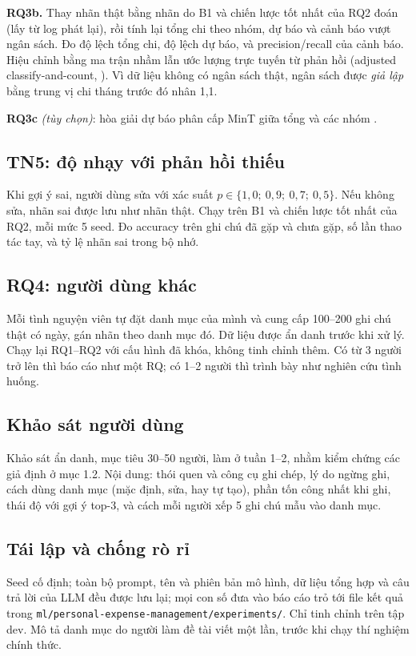 \documentclass[12pt,a4paper]{article}
\begin{document}
\textbf{RQ3b.} Thay nhãn thật bằng nhãn do B1 và chiến lược tốt nhất của RQ2 đoán (lấy từ log phát lại), rồi tính lại tổng chi theo nhóm, dự báo và cảnh báo vượt ngân sách. Đo độ lệch tổng chi, độ lệch dự báo, và precision/recall của cảnh báo. Hiệu chỉnh bằng ma trận nhầm lẫn ước lượng trực tuyến từ phản hồi (adjusted classify-and-count, \citealp{forman2008quantifying}). Vì dữ liệu không có ngân sách thật, ngân sách được \emph{giả lập} bằng trung vị chi tháng trước đó nhân 1,1.

\textbf{RQ3c} \emph{(tùy chọn)}: hòa giải dự báo phân cấp MinT giữa tổng và các nhóm \citep{wickramasuriya2019mint}.

\subsection{TN5: độ nhạy với phản hồi thiếu}
Khi gợi ý sai, người dùng sửa với xác suất $p \in \{1{,}0;\ 0{,}9;\ 0{,}7;\ 0{,}5\}$. Nếu không sửa, nhãn sai được lưu như nhãn thật. Chạy trên B1 và chiến lược tốt nhất của RQ2, mỗi mức 5 seed. Đo accuracy trên ghi chú đã gặp và chưa gặp, số lần thao tác tay, và tỷ lệ nhãn sai trong bộ nhớ.

\subsection{RQ4: người dùng khác}
Mỗi tình nguyện viên tự đặt danh mục của mình và cung cấp 100--200 ghi chú thật có ngày, gán nhãn theo danh mục đó. Dữ liệu được ẩn danh trước khi xử lý. Chạy lại RQ1--RQ2 với cấu hình đã khóa, không tinh chỉnh thêm. Có từ 3 người trở lên thì báo cáo như một RQ; có 1--2 người thì trình bày như nghiên cứu tình huống.

\subsection{Khảo sát người dùng}\label{sec:khaosat}
Khảo sát ẩn danh, mục tiêu 30--50 người, làm ở tuần 1--2, nhằm kiểm chứng các giả định ở mục 1.2. Nội dung: thói quen và công cụ ghi chép, lý do ngừng ghi, cách dùng danh mục (mặc định, sửa, hay tự tạo), phần tốn công nhất khi ghi, thái độ với gợi ý top-3, và cách mỗi người xếp 5 ghi chú mẫu vào danh mục.

\subsection{Tái lập và chống rò rỉ}
Seed cố định; toàn bộ prompt, tên và phiên bản mô hình, dữ liệu tổng hợp và câu trả lời của LLM đều được lưu lại; mọi con số đưa vào báo cáo trỏ tới file kết quả trong \texttt{ml/personal-expense-management/experiments/}. Chỉ tinh chỉnh trên tập dev. Mô tả danh mục do người làm đề tài viết một lần, trước khi chạy thí nghiệm chính thức.
\end{document}
